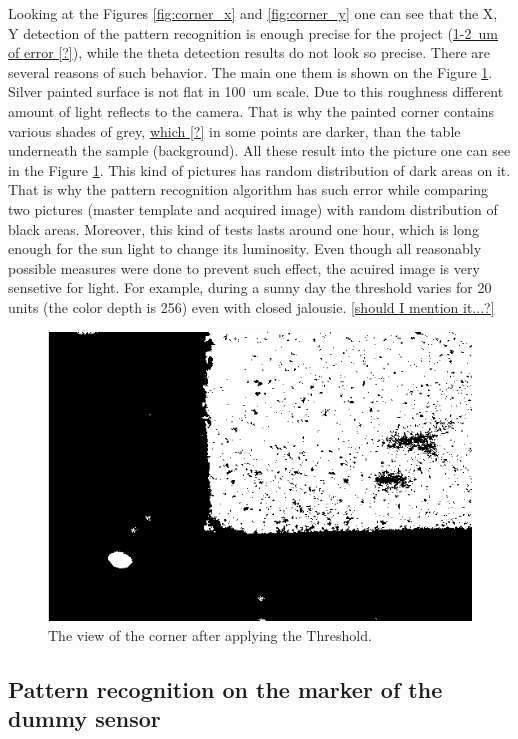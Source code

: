 Looking at the Figures \ref{fig:corner_x} and \ref{fig:corner_y} one can see that the X, Y detection of the pattern recognition is enough precise for the project (\underline{1-2~um of error [?]}), while the theta detection results do not look so precise. There are several reasons of such behavior. The main one them is shown on the Figure \ref{fig:corner_threshold}.
\\Silver painted surface is not flat in 100~um scale. Due to this roughness different amount of light reflects to the camera. That is why the painted corner contains various shades of grey, \underline{which [?]} in some points are darker, than the table underneath the sample (background). All these result into the picture one can see in the Figure \ref{fig:corner_threshold}. This kind of pictures has random distribution of dark areas on it. That is why the pattern recognition algorithm has such error while comparing two pictures (master template and acquired image) with random distribution of black areas. Moreover, this kind of tests lasts around one hour, which is long enough for the sun light to change its luminosity. Even though all reasonably possible measures were done to prevent such effect, the acuired image is very sensetive for light. For example, during a sunny day the threshold varies for 20 units (the color depth is 256) even with closed jalousie. \underline{[should I mention it...?]}

\begin{figure}[ht]\centering
\includegraphics[width=0.8\linewidth]{Data/Precision_tests/Corner_thresholded.png}
\caption{The view of the corner after applying the Threshold.}
\label{fig:corner_threshold}
\end{figure}

\subsection{Pattern recognition on the marker of the dummy sensor}

